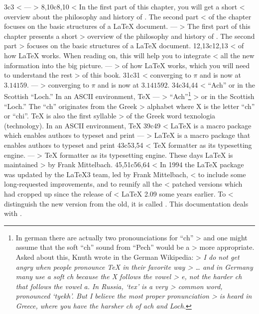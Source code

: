 3c3
< %
---
> %
8,10c8,10
< In the first part of this chapter, you will get a short 
< overview about the philosophy and history of \LaTeXe. The second part
< of the chapter focuses on the basic structures of a \LaTeX{} document. 
---
> The first part of this chapter presents a short 
> overview of the philosophy and history of \LaTeXe. The second part
> focuses on the basic structures of a \LaTeX{} document. 
12,13c12,13
< of how \LaTeX{} works. When reading on, this will help you to integrate
< all the new information into the big picture.  
---
> of how \LaTeX{} works, which you will need to understand the rest
> of this book.  
31c31
< converging to $\pi$ and is now at $3.14159$.
---
> converging to $\pi$ and is now at $3.141592$.
34c34,44
< ``Ach'' or in the Scottish ``Loch.'' In an ASCII environment, \TeX{}
---
> ``Ach''\footnote{In german there are actually two pronounciations for ``ch''
> and one might assume that the soft ``ch'' sound from ``Pech'' would be a
> more appropriate. Asked about this, Knuth wrote in the German Wikipedia:
> \emph{I do not get angry when people pronounce \TeX{} in their favorite way
> \ldots{} and in Germany many use a soft ch because the X follows the vowel
> e, not the harder ch that follows the vowel a. In Russia, `tex' is a very
> common word, pronounced `tyekh'. But I believe the most proper pronunciation
> is heard in Greece, where you have the harsher ch of ach and Loch.}}
> or in the Scottish ``Loch.'' The ``ch'' originates from the Greek
> alphabet where X is the letter ``ch'' or ``chi''. \TeX{} is also the first syllable
> of the Greek word texnologia (technology). In an ASCII environment, \TeX{}
39c49
< \LaTeX{} is a macro package which enables authors to typeset and print
---
> \LaTeX{} is a macro package that enables authors to typeset and print
43c53,54
< \TeX{} formatter as its typesetting engine.
---
> \TeX{} formatter as its typesetting engine. These days \LaTeX{} is maintained
> by Frank Mittelbach.
45,51c56,64
< In 1994 the \LaTeX{} package was updated by the \LaTeX 3 team, led by Frank Mittelbach,
< to include some long-requested improvements, and to re\-unify all the
< patched versions which had cropped up since the release of
< \LaTeX{} 2.09 some years earlier. To
< distinguish the new version from the old, it is called \LaTeXe. This documentation deals with \LaTeXe.
